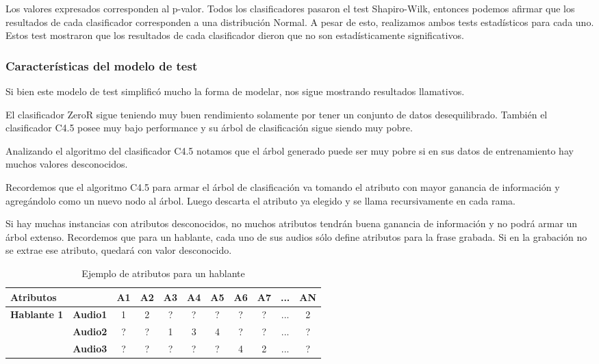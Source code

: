  Los valores expresados corresponden al p-valor. Todos los clasificadores pasaron el test Shapiro-Wilk, entonces podemos afirmar que los resultados de cada clasificador corresponden a una distribución Normal. A pesar de esto, realizamos ambos tests estadísticos para cada uno. Estos test mostraron que los resultados de cada clasificador dieron que no son estadísticamente significativos.


\subsubsection{Características del modelo de test}

Si bien este modelo de test simplificó mucho la forma de modelar, nos sigue mostrando resultados llamativos. 

El clasificador ZeroR sigue teniendo muy buen rendimiento solamente por tener un conjunto de datos desequilibrado. También el clasificador C4.5 posee muy bajo performance y su árbol de clasificación sigue siendo muy pobre.  

Analizando el algoritmo del clasificador C4.5 notamos que el árbol generado puede ser muy pobre si en sus datos de entrenamiento hay muchos valores desconocidos. 

Recordemos que el algoritmo C4.5 para armar el árbol de clasificación va tomando el atributo con mayor ganancia de información y agregándolo como un nuevo nodo al árbol. Luego descarta el atributo ya elegido y se llama recursivamente en cada rama. 

Si hay muchas instancias con atributos desconocidos, no muchos atributos tendrán buena ganancia de información y no podrá armar un árbol extenso. Recordemos que para un hablante, cada uno de sus audios sólo define atributos para la frase grabada. Si en la grabación no se extrae ese atributo, quedará con valor desconocido. 

\begin{table}[H]
	\centering
	\begin{tabular}{|l|l|ccccccccc|}
		\hline
		\multicolumn{2}{|l|}{Atributos} & A1 & A2 & A3 & A4 & A5 & A6 & A7 & ... & AN \\
		\hline 
		\textbf{Hablante 1} & \textbf{Audio1} & 1 & 2 & ? & ? & ? & ? & ? & ... & 2 \\
		& \textbf{Audio2} & ? & ? & 1 & 3 & 4 & ? & ? & ... & ? \\
		& \textbf{Audio3} & ? & ? & ? & ? & ? & 4 & 2 &  ... & ? \\
		\hline
	\end{tabular}
	\caption{Ejemplo de atributos para un hablante}
	\label{hablante_ej}
\end{table}

